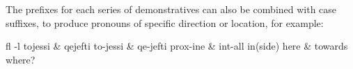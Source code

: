 \documentclass[grammar]{subfiles}
\begin{document}
	The prefixes for each series of demonstratives can also be combined with case suffixes, to produce pronouns of specific direction or location, for example:

	\begin{exe}
		\ex\label{tab:nm_demonstrative_prefixes}
		\begin{tabular}[t]{fl -l}
			\SetRowStyle{\itshape} tojessi & qejefti \tabularnewline
			to-jessi & qe-jefti \tabularnewline
			\SetRowStyle{\scshape} prox-ine & int-all \tabularnewline
			in(side) here & towards where?
		\end{tabular}
	\end{exe}
\end{document}
